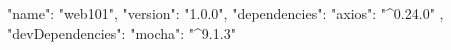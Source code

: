 {
  "name": "web101",
  "version": "1.0.0",
  "dependencies": {
    "axios": "^0.24.0"
  },
  "devDependencies": {
    "mocha": "^9.1.3"
  }
}